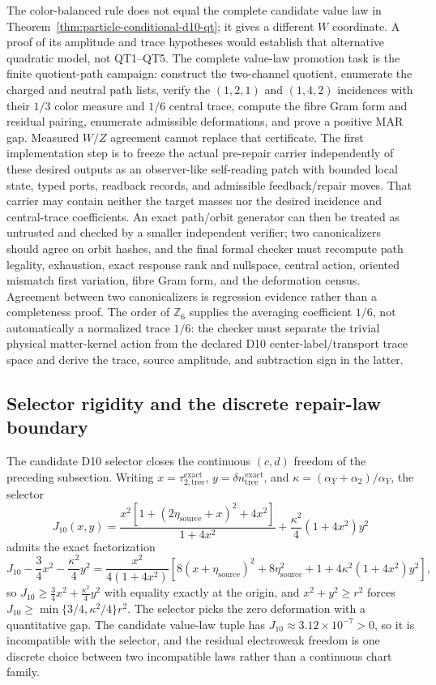 \documentclass[11pt]{article}
\begin{document}
The color-balanced rule does not equal the complete candidate value law in
Theorem~\ref{thm:particle-conditional-d10-qt}; it gives a different \(W\)
coordinate.  A proof of its amplitude and trace hypotheses would establish
that alternative quadratic model, not QT1--QT5.  The complete value-law
promotion task is the finite quotient-path campaign: construct the two-channel
quotient, enumerate the charged and neutral path lists, verify the
\((1,2,1)\) and \((1,4,2)\) incidences with their \(1/3\) color measure and
\(1/6\) central trace, compute the fibre Gram form and residual pairing,
enumerate admissible deformations, and prove a positive MAR gap.  Measured
\(W/Z\) agreement cannot replace that certificate.  The first implementation
step is to freeze the actual pre-repair carrier independently of these desired
outputs as an observer-like self-reading patch with bounded local state,
typed ports, readback records, and admissible feedback/repair moves.  That
carrier may contain neither the target masses nor the desired
incidence and central-trace coefficients.  An exact path/orbit generator can
then be treated as untrusted and checked by a smaller independent verifier;
two canonicalizers should agree on orbit hashes, and the final formal checker
must recompute path legality, exhaustion, exact response rank and nullspace,
central action, oriented mismatch first variation, fibre Gram form, and the
deformation census.  Agreement between two canonicalizers is regression
evidence rather than a completeness proof.  The order of
\(\mathbb Z_6\) supplies the averaging coefficient \(1/6\), not automatically
a normalized trace \(1/6\): the checker must separate the trivial physical
matter-kernel action from the declared D10 center-label/transport trace space
and derive the trace, source amplitude, and subtraction sign in the latter.

\subsection{Selector rigidity and the discrete repair-law boundary}\label{ew-selector-rigidity}

The candidate D10 selector closes the continuous \((c,d)\) freedom of the
preceding subsection.  Writing \(x=\tau_{2,\mathrm{tree}}^{\mathrm{exact}}\),
\(y=\delta n_{\mathrm{tree}}^{\mathrm{exact}}\), and
\(\kappa=(\alpha_Y+\alpha_2)/\alpha_Y\), the selector
\[
J_{10}(x,y)=\frac{x^2\left[1+(2\eta_{\mathrm{source}}+x)^2+4x^2\right]}{1+4x^2}
+\frac{\kappa^2}{4}(1+4x^2)y^2
\]
admits the exact factorization
\[
J_{10}-\frac34x^2-\frac{\kappa^2}{4}y^2
=\frac{x^2}{4(1+4x^2)}
\left[8(x+\eta_{\mathrm{source}})^2+8\eta_{\mathrm{source}}^2+1
+4\kappa^2(1+4x^2)y^2\right],
\]
so \(J_{10}\ge\frac34x^2+\frac{\kappa^2}{4}y^2\) with equality exactly at the
origin, and \(x^2+y^2\ge r^2\) forces
\(J_{10}\ge\min\{3/4,\kappa^2/4\}r^2\).  The selector picks the zero
deformation with a quantitative gap. The candidate value-law tuple has
\(J_{10}\approx3.12\times10^{-7}>0\), so it is incompatible with the selector,
and the residual electroweak freedom is
one discrete choice between two incompatible laws rather than a continuous
chart family.
\end{document}
